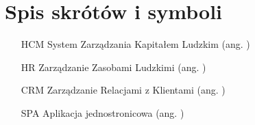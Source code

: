 \chapter{Spis skrótów i symboli}

\begin{itemize}
\item[HCM] System Zarządzania Kapitałem Ludzkim (ang. )
\item[HR] Zarządzanie Zasobami Ludzkimi (ang. )
\item[CRM] Zarządzanie Relacjami z Klientami (ang. )
\item[SPA] Aplikacja jednostronicowa (ang. )
\end{itemize}
